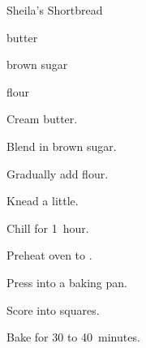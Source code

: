 \begin{recipe}{Sheila's Shortbread}{}{}

\begin{ingredients}
\item {} butter
\item \C{\twothird} brown sugar
\item {} flour
\end{ingredients}

\begin{directions}
\item Cream butter.
\item Blend in brown sugar.
\item Gradually add flour.
\item Knead a little.
\item Chill for 1~hour.
\item Preheat oven to .
\item Press into a baking pan.
\item Score into squares.
\item Bake for 30 to 40~minutes.
\end{directions}

\end{recipe}
